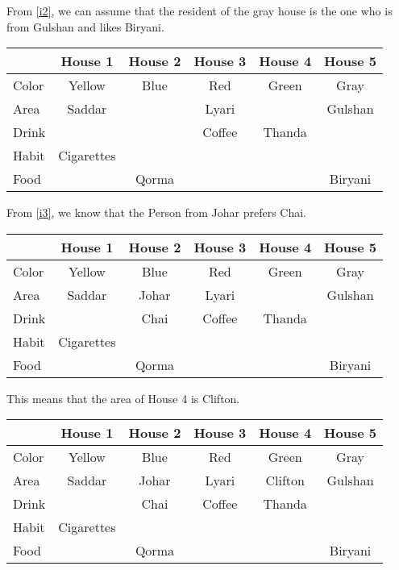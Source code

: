 \documentclass[a4paper]{exam}
\newcommand\cb{\color{blue}}
\begin{document}
\begin{questions}
\begin{solution}
       From \ref{i2}, we can assume that the resident of the gray house is the one who is from Gulshan and likes Biryani. \\
    \begin{tabular}{l||*5{c|}}
      & \textbf{House 1} & \textbf{\cb House 2} & \textbf{House 3} & \textbf{House 4} & \textbf{House 5} \\
      \hline\hline
      Color & Yellow & Blue & Red& Green & Gray\\\hline
      Area & Saddar & & Lyari & & Gulshan\\\hline
      Drink & & &Coffee & Thanda & \\\hline
      Habit & Cigarettes& & & & \\\hline
      Food & & Qorma & & & Biryani\\\hline
      \end{tabular}

       From \ref{i3}, we know that the Person from Johar prefers Chai. \\
    \begin{tabular}{l||*5{c|}}
      & \textbf{House 1} & \textbf{\cb House 2} & \textbf{House 3} & \textbf{House 4} & \textbf{House 5} \\
      \hline\hline
      Color & Yellow & Blue & Red& Green & Gray\\\hline
      Area & Saddar & Johar& Lyari & & Gulshan\\\hline
      Drink & & Chai&Coffee & Thanda & \\\hline
      Habit & Cigarettes& & & & \\\hline
      Food & & Qorma & & & Biryani\\\hline
      \end{tabular}

    This means that the area of House 4 is Clifton.\\
      \begin{tabular}{l||*5{c|}}
      & \textbf{House 1} & \textbf{\cb House 2} & \textbf{House 3} & \textbf{House 4} & \textbf{House 5} \\
      \hline\hline
      Color & Yellow & Blue & Red& Green & Gray\\\hline
      Area & Saddar & Johar& Lyari & Clifton & Gulshan\\\hline
      Drink & & Chai&Coffee & Thanda & \\\hline
      Habit & Cigarettes& & & & \\\hline
      Food & & Qorma & & & Biryani\\\hline
      \end{tabular}


\end{solution}
\end{questions}
\end{document}
